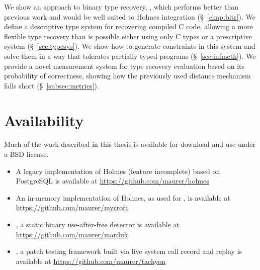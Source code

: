 We show an approach to binary type recovery, \bitr, which performs better than previous work and would be well suited to Holmes integration (\S~\ref{chap:bitr}).
We define a descriptive type system for recovering compiled C code, allowing a more flexible type recovery than is possible either using only C types or a prescriptive system (\S~\ref{sec:typesys}).
We show how to generate constraints in this system and solve them in a way that tolerates partially typed programs (\S~\ref{sec:infmeth}).
We provide a novel measurement system for type recovery evaluation based on its probability of correctness, showing how the previously used distance mechanism falls short (\S~\ref{subsec:metrics}).

\section{Availability}
Much of the work described in this thesis is available for download and use under a BSD license.
\begin{itemize}
\item A legacy implementation of Holmes (feature incomplete) based on PostgreSQL is available at \url{https://github.com/maurer/holmes}
\item An in-memory implementation of Holmes, as used for \aliasname, is available at \url{https://github.com/maurer/mycroft}
\item \aliasname, a static binary use-after-free detector is available at\\ \url{https://github.com/maurer/marduk}
\item \tachyon, a patch testing framework built via live system call record and replay is available at \url{https://github.com/maurer/tachyon}
\end{itemize}
